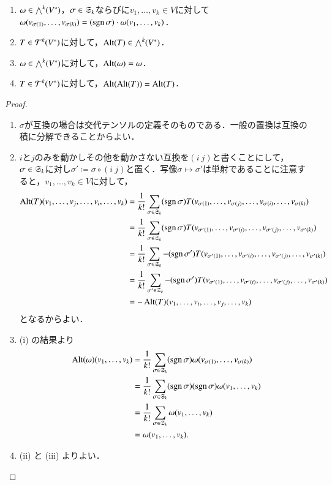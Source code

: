 \begin{prop}[交代化作用素の基本性質]\label{交代化作用素の基本性質}
\leavevmode
\begin{enumerate}
\item $\omega \in \bigwedge^k(V^*)$，$\sigma \in \mathfrak{S}_k$ならびに$v_1, \dots, v_k \in V$に対して$\omega(v_{\sigma(1)},\dots,v_{\sigma(k)}) = (\operatorname{sgn} \sigma)\cdot \omega(v_1, \dots, v_k)$．
\item $T \in \mathcal{T}^k(V^*)$に対して，$\operatorname{Alt}(T) \in \bigwedge^k(V^*)$．
\item $\omega \in \bigwedge^k(V^*)$に対して，$\operatorname{Alt}(\omega) = \omega$．
\item $T \in \mathcal{T}^k(V^*)$に対して，$\operatorname{Alt}(\operatorname{Alt}(T)) = \operatorname{Alt}(T)$．
\end{enumerate}
\end{prop}

\begin{proof}
\leavevmode
\begin{enumerate}
\item $\sigma$が互換の場合は交代テンソルの定義そのものである．一般の置換は互換の積に分解できることからよい．
\item $i$と$j$のみを動かしその他を動かさない互換を$(i \ j)$と書くことにして，$\sigma \in \mathfrak{S}_k$に対し$\sigma' \coloneqq \sigma \circ (i \ j)$と置く．写像$\sigma \mapsto \sigma'$は単射であることに注意すると，$v_1, \dots, v_k \in V$に対して，
\begin{align}
\operatorname{Alt}(T)(v_1, \dots, v_j, \dots, v_i, \dots, v_k) &= \frac{1}{k!} \sum_{\sigma \in \mathfrak{S}_k} (\operatorname{sgn} \sigma) T(v_{\sigma(1)}, \dots, v_{\sigma(j)}, \dots, v_{\sigma(i)}, \dots, v_{\sigma(k)}) \\
&= \frac{1}{k!} \sum_{\sigma \in \mathfrak{S}_k} (\operatorname{sgn}\sigma)T(v_{\sigma'(1)}, \dots, v_{\sigma'(i)}, \dots, v_{\sigma'(j)}, \dots, v_{\sigma'(k)}) \\
&= \frac{1}{k!} \sum_{\sigma \in \mathfrak{S}_k} -(\operatorname{sgn}\sigma')T(v_{\sigma'(1)}, \dots, v_{\sigma'(i)}, \dots, v_{\sigma'(j)}, \dots, v_{\sigma'(k)}) \\
&= \frac{1}{k!} \sum_{\sigma' \in \mathfrak{S}_k} -(\operatorname{sgn}\sigma')T(v_{\sigma'(1)}, \dots, v_{\sigma'(i)}, \dots, v_{\sigma'(j)}, \dots, v_{\sigma'(k)}) \\
&= -\operatorname{Alt}(T)(v_1, \dots, v_i, \dots, v_j, \dots, v_k)
\end{align}となるからよい．
\item (i) の結果より
\begin{align}
\operatorname{Alt}(\omega) (v_1, \dots, v_k) &= \frac{1}{k!} \sum_{\sigma \in \mathfrak{S}_k} (\operatorname{sgn} \sigma )\omega(v_{\sigma(1)}, \dots, v_{\sigma(k)}) \\
&= \frac{1}{k!} \sum_{\sigma \in \mathfrak{S}_k} (\operatorname{sgn} \sigma )(\operatorname{sgn} \sigma)\omega(v_1, \dots, v_k) \\
&= \frac{1}{k!} \sum_{\sigma \in \mathfrak{S}_k} \omega(v_1, \dots, v_k) \\
&= \omega(v_1,\dots,v_k).
\end{align}
\item (ii) と (iii) よりよい．
\end{enumerate}
\end{proof}

